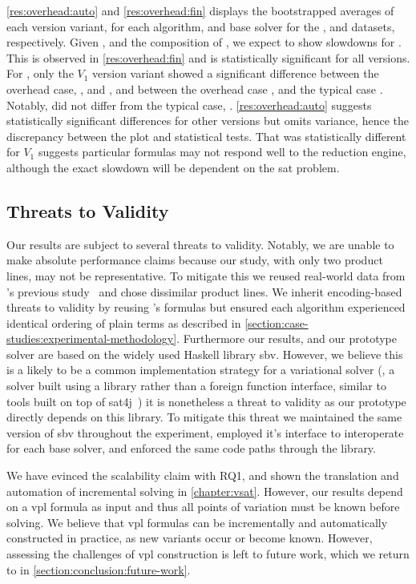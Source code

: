 %
\autoref{res:overhead:auto} and \autoref{res:overhead:fin} displays the
bootstrapped averages of each version variant, for each algorithm, and base
solver for the \auto{}, and \fin{} datasets, respectively. Given , and
the composition of \fin{}, we expect \vsat{} to show slowdowns for \fin{}. This
is observed in \autoref{res:overhead:fin} and is statistically significant for
all versions. For \auto{}, only the $V_{1}$ version variant showed a significant
difference between the overhead case, \pTov{}, and \vTov{}, and between the
overhead case \pTov{}, and the typical case \vTop{}. Notably, \vTov{} did not
differ from the typical case, \vTop{}. \autoref{res:overhead:auto} suggests
statistically significant differences for other versions but omits variance,
hence the discrepancy between the plot and statistical tests. That \pTov{} was
statistically different for $V_{1}$ suggests particular formulas may not respond
well to the reduction engine, although the exact slowdown will be dependent on
the \ac{sat} problem.

\subsection{Threats to Validity}
Our results are subject to several threats to validity. Notably, we are unable
to make absolute performance claims because our study, with only two product
lines, may not be representative. To mitigate this we reused real-world data
from \nieke{}'s previous study~\citep{NMS+:GPCE18} and chose dissimilar product
lines. We inherit encoding-based threats to validity by reusing \nieke{}'s
formulas but ensured each algorithm experienced identical ordering of plain
terms as described in \autoref{section:case-studies:experimental-methodology}.
Furthermore our results, and our prototype solver are based on the widely used
Haskell library sbv. However, we believe this is a likely to be a common
implementation strategy for a variational solver (\ie{}, a solver built using a
library rather than a foreign function interface, similar to tools built on top
of sat4j~\citep{LP:JSAT10}) it is nonetheless a threat to validity as our
prototype directly depends on this library. To mitigate this threat we
maintained the same version of sbv throughout the experiment, employed it's
interface to interoperate for each base solver, and enforced the same code paths
through the library.

We have evinced the scalability claim with RQ1, and shown the translation and
automation of incremental solving in \autoref{chapter:vsat}. However, our
results depend on a \ac{vpl} formula as input and thus all points of variation
must be known before solving. We believe that \ac{vpl} formulas can be
incrementally and automatically constructed in practice, as new variants occur
or become known. However, assessing the challenges of \ac{vpl} construction is
left to future work, which we return to in
\autoref{section:conclusion:future-work}.


